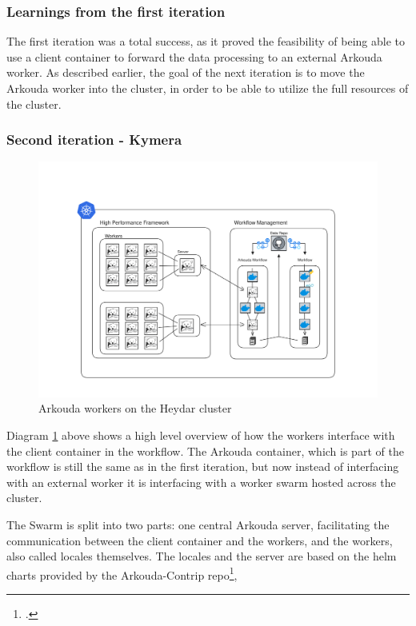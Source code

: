 \subsubsection*{Learnings from the first iteration}

The first iteration was a total success, as it proved the feasibility of being able to use a client container to forward the data processing to an external Arkouda worker.
As described earlier, the goal of the next iteration is to move the Arkouda worker into the cluster, in order to be able to utilize the full resources of the cluster.

\subsubsection{Second iteration - Kymera}

\begin{figure}[htb]
    \centering
    \includegraphics[width=16cm]{graphics/PachyKouda.png}
    \caption[Arkouda workers on \ac{k8s}]{Arkouda workers on the Heydar cluster}
    \label{abb:arkouda_workers_on_k8s}
\end{figure}

Diagram \ref{abb:arkouda_workers_on_k8s} above shows a high level overview of how the workers interface with the client container in the workflow.
The Arkouda container, which is part of the workflow is still the same as in the first iteration, but now instead of interfacing with an external worker it 
is interfacing with a worker swarm hosted across the cluster.

The Swarm is split into two parts: one central Arkouda server, facilitating the communication between the client container and the workers, and the workers, also called locales themselves.
The locales and the server are based on the helm charts provided by the Arkouda-Contrip repo\footcite{BearsRUsArkoudacontribArkoudahelmcharts},

